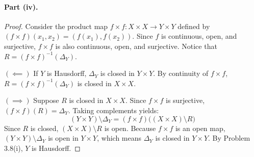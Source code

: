 \paragraph{Part (iv).}
\begin{proof}
Consider the product map $f\times f\colon X\times X\to Y\times Y$ defined by
$(f\times f)(x_1,x_2)=(f(x_1),f(x_2))$. Since $f$ is continuous, open, and surjective,
$f\times f$ is also continuous, open, and surjective. Notice that
$R=(f\times f)^{-1}(\Delta_Y)$.

\smallskip
$(\impliedby)$ If $Y$ is Hausdorff, $\Delta_Y$ is closed in $Y\times Y$. By continuity of
$f\times f$, $R=(f\times f)^{-1}(\Delta_Y)$ is closed in $X\times X$.

\smallskip
$(\implies)$ Suppose $R$ is closed in $X\times X$. Since $f\times f$ is surjective,
$(f\times f)(R)=\Delta_Y$. Taking complements yields:
\[ (Y\times Y)\setminus\Delta_Y=(f\times f)\big((X\times X)\setminus R\big) \]
Since $R$ is closed, $(X\times X)\setminus R$ is open. Because $f\times f$ is an open map,
$(Y\times Y)\setminus\Delta_Y$ is open in $Y\times Y$, which means $\Delta_Y$ is closed in
$Y\times Y$. By Problem 3.8(i), $Y$ is Hausdorff.
\end{proof}
